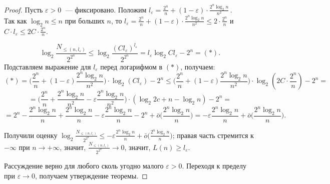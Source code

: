 \begin{proof}
Пусть $\varepsilon > 0 \;$ --- фиксировано. Положим $l_\varepsilon = \frac{2^n}{n} + (1-\varepsilon) \cdot \frac{2^n \log_2 n}{n^2}\,$.\\
Так как $\log_2 n \leq n $ при больших $n$, то $l_\varepsilon = \frac{2^n}{n} + (1-\varepsilon) \cdot \frac{2^n \log_2 n}{n^2} \leq 2\cdot \frac{2^n}{n}$ и $C\cdot l_\varepsilon \leq 2C\cdot \frac{2^n}{n}$.

$$ \log_2{\frac{N_{\leq(n,l_\varepsilon)}}{2^{2^n}}} \leq \log_2 {\frac{(Cl_\varepsilon)^{l_\varepsilon}}{2^{2^n}}} = l_\varepsilon \log_2 Cl_\varepsilon - 2^n = (*).$$
Подставляем выражение для $l_\varepsilon$ перед логарифмом в $(*)$, получаем:
$$(*) = \Big(\frac{2^n}{n} + (1-\varepsilon)\frac{2^n\log_2 n}{n^2}\Big)\cdot \log_2(Cl_\varepsilon) - 2^n 
\leq \Big(\frac{2^n}{n} + (1-\varepsilon)\frac{2^n\log_2 n}{n^2}\Big)\cdot\log_2(2C\cdot \frac{2^n}{n}) - 2^n =$$ 
$$ = \Big( \frac{2^n}{n} + \frac{2^n\log_2 n}{n^2} - \varepsilon\frac{2^n\log_2 n}{n^2} \Big)\cdot (\log_2 2c + n - \log_2 n ) - 2^n = $$ $$= 2^n - \frac{2^n\log_2n}{n} + \frac{2^n\log_2n}{n} - \varepsilon\frac{2^n\log_2n}{n} - 2^n + \bar{o}\big( \frac{2^n\log_2n}{n} \big) = - \varepsilon\frac{2^n\log_2n}{n} + \bar{o}\big( \frac{2^n\log_2n}{n}\big).$$

Получили оценку 
$\log_2{\frac{N_{\leq(n,l_\varepsilon)}}{2^{2^n}}} \leq - \varepsilon\frac{2^n\log_2n}{n} + \bar{o}\big( \frac{2^n\log_2n}{n}\big)$; правая часть стремится к $-\infty$ при $n \rightarrow +\infty$, значит, $\frac{N_{\leq(n,l_\varepsilon)}}{2^{2^n}} \rightarrow 0$, значит, $L(n) \geq l_\varepsilon$. 

Рассуждение верно для любого сколь угодно малого $\varepsilon > 0$. Переходя к пределу при $\varepsilon \rightarrow 0$, получаем утверждение теоремы.
\end{proof}
